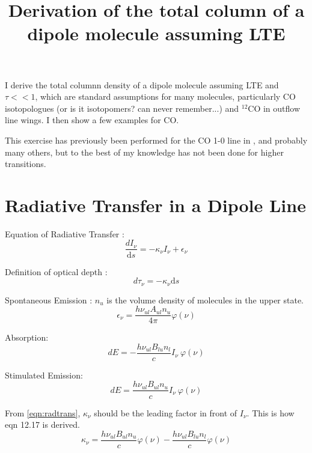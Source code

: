\documentclass[preprint]{aastex}
\newcommand{\ds}{\ensuremath{\textrm{d}s}}
\begin{document}
\title{Derivation of the total column of a dipole molecule assuming LTE}

I derive the total columnn density of a dipole molecule assuming LTE and
$\tau<<1$, which are standard assumptions for many molecules, particularly CO
isotopologues (or is it isotopomers?  can never remember...) and $^{12}$CO in
outflow line wings.  I then show a few examples for CO.

This exercise has previously been performed for the CO 1-0 line in
\citet{bourke1997,garden1991,cabrit1990}, and probably many others, but to the
best of my knowledge has not been done for higher transitions.

\section{Radiative Transfer in a Dipole Line}
Equation of Radiative Transfer \citep[][eqn 1.9]{rohlfs}:
\begin{equation}
  \label{eqn:radtrans}
  \frac{dI_\nu}{\ds} = -\kappa_\nu I_\nu + \epsilon_\nu
\end{equation}

Definition of optical depth \citep[][eqn 1.15]{rohlfs}:
\begin{equation}
  \label{eqn:optdepth}
  d\tau_\nu = -\kappa_\nu \ds
\end{equation}

Spontaneous Emission \citep[][eqn 12.15]{rohlfs}:  $n_u$ is the volume density of molecules in the upper state.
\begin{equation}
  \epsilon_\nu = \frac{h \nu_{ul} A_{ul} n_u}{4 \pi} \varphi(\nu)
\end{equation}

Absorption:
\begin{equation}
  dE = -\frac{h \nu_{ul} B_{lu} n_l}{c} I_\nu~ \varphi(\nu)
\end{equation}

Stimulated Emission:
\begin{equation}
  dE = \frac{h \nu_{ul} B_{ul} n_u}{c} I_{\nu}~ \varphi(\nu)
\end{equation}

From \eqref{eqn:radtrans}, $\kappa_\nu$ should be the leading factor in front of $I_\nu$.
This is how \citet{rohlfs}  eqn 12.17 is derived.
\begin{equation}
  \label{eqn:kappa}
  \kappa_\nu = \frac{h \nu_{ul} B_{ul} n_u}{c} \varphi(\nu)
              -\frac{h \nu_{ul} B_{lu} n_l}{c} \varphi(\nu)
\end{equation}
\end{document}
